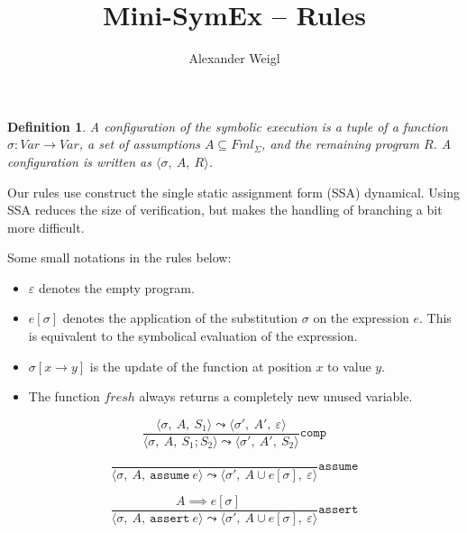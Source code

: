 \documentclass[a4paper]{article}
\newtheorem{definition}{Definition}
\DeclareMathOperator{\semi}{;}
\begin{document}
\author{Alexander Weigl}
\title{Mini-SymEx -- Rules}
\maketitle

\newcommand\config[3]{\langle #1,\:  #2,\: #3 \rangle}

\begin{definition}
  A configuration of the symbolic execution is a tuple of a function
  $\sigma \colon Var \to Var$, a set of assumptions $A \subseteq Fml_\Sigma$,
  and the remaining program $R$.
  A configuration is   written as $\config{\sigma}AR$.
\end{definition}

\def\epsilon{\varepsilon}

Our rules use construct the single static assignment form (SSA) dynamical. Using
SSA reduces the size of verification, but makes the handling of branching a bit
more difficult.

Some small notations in the rules below:
\begin{itemize}
\item $\epsilon$ denotes the empty program.
\item $e[\sigma]$ denotes the application of the substitution $\sigma$ on the
  expression $e$. This is equivalent to the symbolical evaluation of the
  expression.
\item $\sigma[x \to y]$ is the update of the function at position $x$ to value
  $y$.

\item The function $fresh$ always returns a completely new unused variable.
\end{itemize}


\begin{equation}
  \label{ex:1}
  \frac%
  {
    \config{\sigma}{A}{S_1} \leadsto \config{\sigma'}{A'}{\epsilon}
  }%
  {
    \config\sigma{A}{S_1\semi S_2}
    \leadsto
    \config{\sigma'}{A'}{S_2}
  }\mathtt{comp}
\end{equation}

\begin{equation}
  \label{ex:1}
  \frac%
  {
    \quad%
  }%
  {
    \config\sigma A{\mathtt{assume}~e}
    \leadsto
    \config{\sigma'}{A \cup e[\sigma]}{\epsilon}
  }\mathtt{assume}
\end{equation}


\begin{equation}
  \label{ex:1}
  \frac%
  {
    A \implies e[\sigma]
    \quad%
  }%
  {
    \config\sigma A{\mathtt{assert}~e}
    \leadsto
    \config{\sigma'}{A \cup e[\sigma]}{\epsilon}
  }\mathtt{assert}
\end{equation}
\end{document}
